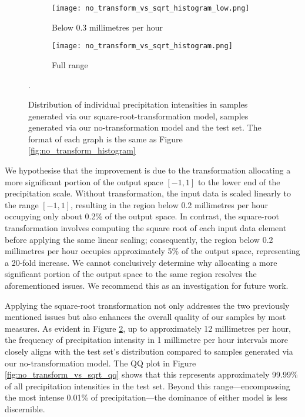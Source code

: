 \documentclass[ oneside,%
                    author={George Herbert},
                    degree={MSci},
                     title={Diffusion Models for Time-Evolving Precipitation Fields},
                  subtitle={}]{dissertation}
\begin{document}
\begin{figure}[htbp]
      \centering
      \begin{subfigure}{.49\textwidth}
            \texttt{[image: no\_transform\_vs\_sqrt\_histogram\_low.png]}
            \caption{Below 0.3 millimetres per hour}
            \label{fig:no_transform_vs_sqrt_histogram_low}
      \end{subfigure}
      \begin{subfigure}{.49\textwidth}
            \texttt{[image: no\_transform\_vs\_sqrt\_histogram.png]}
            \caption{Full range}
            \label{fig:no_transform_vs_sqrt_histogram_full}
      \end{subfigure}
      \caption{Distribution of individual precipitation intensities in samples generated via our square-root-transformation model, samples generated via our no-transformation model and the test set. The format of each graph is the same as Figure \ref{fig:no_transform_histogram}}.
      \label{fig:no_transform_vs_sqrt_histogram}
\end{figure}

We hypothesise that the improvement is due to the transformation allocating a more significant portion of the output space $[-1, 1]$ to the lower end of the precipitation scale. Without transformation, the input data is scaled linearly to the range $[-1, 1]$, resulting in the region below 0.2 millimetres per hour occupying only about 0.2\% of the output space. In contrast, the square-root transformation involves computing the square root of each input data element before applying the same linear scaling; consequently, the region below 0.2 millimetres per hour occupies approximately 5\% of the output space, representing a 20-fold increase. We cannot conclusively determine why allocating a more significant portion of the output space to the same region resolves the aforementioned issues. We recommend this as an investigation for future work.

Applying the square-root transformation not only addresses the two previously mentioned issues but also enhances the overall quality of our samples by most measures. As evident in Figure \ref{fig:no_transform_vs_sqrt_histogram_full}, up to approximately 12 millimetres per hour, the frequency of precipitation intensity in 1 millimetre per hour intervals more closely aligns with the test set's distribution compared to samples generated via our no-transformation model. The QQ plot in Figure \ref{fig:no_transform_vs_sqrt_qq} shows that this represents approximately 99.99\% of all precipitation intensities in the test set. Beyond this range---encompassing the most intense 0.01\% of precipitation---the dominance of either model is less discernible.
\end{document}
